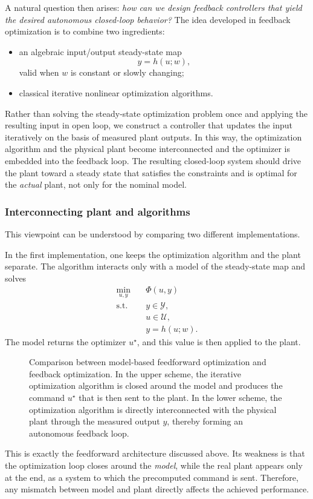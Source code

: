 A natural question then arises: \emph{how can we design feedback controllers that yield the desired autonomous closed-loop behavior?} The idea developed in feedback optimization is to combine two ingredients:
\begin{itemize}
    \item an algebraic input/output steady-state map
    \[
    y = h(u;w),
    \]
    valid when $w$ is constant or slowly changing;
    \item classical iterative nonlinear optimization algorithms.
\end{itemize}
Rather than solving the steady-state optimization problem once and applying the resulting input in open loop, we construct a controller that updates the input iteratively on the basis of measured plant outputs. In this way, the optimization algorithm and the physical plant become interconnected and the optimizer is embedded into the feedback loop. The resulting closed-loop system should drive the plant toward a steady state that satisfies the constraints and is optimal for the \emph{actual} plant, not only for the nominal model.

\subsubsection{Interconnecting plant and algorithms}

This viewpoint can be understood by comparing two different implementations.

In the first implementation, one keeps the optimization algorithm and the plant separate. The algorithm interacts only with a model of the steady-state map and solves
\[
\begin{aligned}
\min_{u,y}\quad & \Phi(u,y)\\
\text{s.t.}\quad & y \in \mathcal Y,\\
& u \in \mathcal U,\\
& y = h(u;w).
\end{aligned}
\]
The model returns the optimizer $u^\star$, and this value is then applied to the plant.
\begin{figure}[!h]
    \centering
    
    \caption{Comparison between model-based feedforward optimization and feedback optimization. In the upper scheme, the iterative optimization algorithm is closed around the model and produces the command $u^\star$ that is then sent to the plant. In the lower scheme, the optimization algorithm is directly interconnected with the physical plant through the measured output $y$, thereby forming an autonomous feedback loop.}
    \label{fig:interconnection-optimization-plant}
\end{figure}
This is exactly the feedforward architecture discussed above. Its weakness is that the optimization loop closes around the \emph{model}, while the real plant appears only at the end, as a system to which the precomputed command is sent. Therefore, any mismatch between model and plant directly affects the achieved performance.

